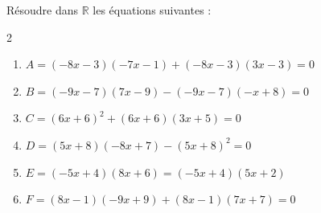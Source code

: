 {%
\begin{Exercice}%
Résoudre dans $\mathbb R$ les équations suivantes :
\begin{multicols}{2}
\begin{enumerate}[itemsep=1em,label={}]
	\item \begin{minipage}[t]{\linewidth} $A = (-8x-3)( -7x-1)+(-8x-3)(3x-3)=0$\end{minipage}
	\item \begin{minipage}[t]{\linewidth} $B = (-9x-7)( 7x-9)-
                    ( -9x-7)( -x+8)=0$\end{minipage}
	\item \begin{minipage}[t]{\linewidth} $C = (6x+6)^{2}+(6x+6)(3x+5)=0$\end{minipage}
	\item \begin{minipage}[t]{\linewidth} $D = (5x+8)( -8x+7)-(5x+8)^{2}=0$\end{minipage}
	\item \begin{minipage}[t]{\linewidth}$E = (-5x+4)(8x+6)=(-5x+4)(5x+2)$\end{minipage}
	\item \begin{minipage}[t]{\linewidth} $F = (8x-1)( -9x+9)+(8x-1)(7x+7)=0$\end{minipage}
\end{enumerate}
\end{multicols}
\end{Exercice}

}
